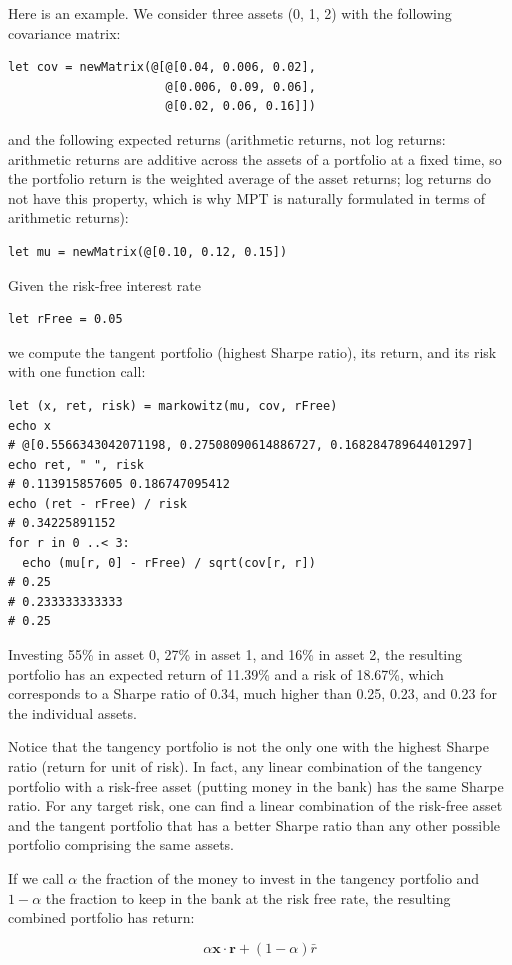 \documentclass[justified, sixbynine]{tufte-book}
\theoremstyle{plain}%
\newtheorem * {corollary}{Corollary}
\theoremstyle{definition}
\theoremstyle{remark}
\newtheorem * {remark}{Remark}
\newtheorem * {note}{Note}
\begin{document}
\begin{fullwidth}
Here is an example.
We consider three assets (0, 1, 2) with the following covariance matrix:
\begin{lstlisting}
let cov = newMatrix(@[@[0.04, 0.006, 0.02],
                      @[0.006, 0.09, 0.06],
                      @[0.02, 0.06, 0.16]])
\end{lstlisting}
and the following expected returns (arithmetic returns, not log returns: arithmetic returns are additive across the assets of a portfolio at a fixed time, so the portfolio return is the weighted average of the asset returns; log returns do not have this property, which is why MPT is naturally formulated in terms of arithmetic returns):
\begin{lstlisting}
let mu = newMatrix(@[0.10, 0.12, 0.15])
\end{lstlisting}
Given the risk-free interest rate
\begin{lstlisting}
let rFree = 0.05
\end{lstlisting}
we compute the tangent portfolio (highest Sharpe ratio), its return, and its risk with one function call:
\begin{lstlisting}
let (x, ret, risk) = markowitz(mu, cov, rFree)
echo x
# @[0.5566343042071198, 0.27508090614886727, 0.16828478964401297]
echo ret, " ", risk
# 0.113915857605 0.186747095412
echo (ret - rFree) / risk
# 0.34225891152
for r in 0 ..< 3:
  echo (mu[r, 0] - rFree) / sqrt(cov[r, r])
# 0.25
# 0.233333333333
# 0.25
\end{lstlisting}

Investing 55\% in asset 0, 27\% in asset 1, and 16\% in asset 2, the resulting portfolio has an expected return of 11.39\% and a risk of 18.67\%, which corresponds to a Sharpe ratio of 0.34, much higher than 0.25, 0.23, and 0.23 for the individual assets.

Notice that the tangency portfolio is not the only one with the highest Sharpe ratio (return for unit of risk). In fact, any linear combination of the tangency portfolio with a risk-free asset (putting money in the bank) has the same Sharpe ratio. For any target risk, one can find a linear combination of the risk-free asset and the tangent portfolio that has a better Sharpe ratio than any other possible portfolio comprising the same assets.

If we call $\alpha$ the fraction of the money to invest in the tangency portfolio and $1-\alpha$ the fraction to keep in the bank at the risk free rate, the resulting combined portfolio has return:

\begin{equation}
\alpha \mathbf{x}\cdot\mathbf{r} + (1-\alpha) \bar r
\end{equation}


\end{fullwidth}
\end{document}
